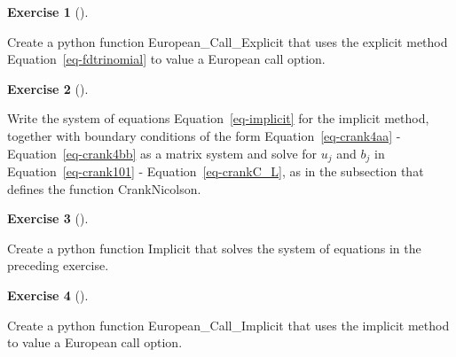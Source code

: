 \documentclass[
  letterpaper,
  DIV=11,
  numbers=noendperiod]{scrartcl}
\theoremstyle{definition}
\newtheorem{exercise}{Exercise}[section]
\theoremstyle{remark}
\begin{document}
\begin{exercise}[]\protect\hypertarget{exr-nolabel}{}\label{exr-nolabel}

Create a python function European\_Call\_Explicit that uses the explicit
method Equation~\ref{eq-fdtrinomial} to value a European call option.

\end{exercise}

\begin{exercise}[]\protect\hypertarget{exr-nolabel}{}\label{exr-nolabel}

Write the system of equations Equation~\ref{eq-implicit} for the
implicit method, together with boundary conditions of the form
Equation~\ref{eq-crank4aa} - Equation~\ref{eq-crank4bb} as a matrix
system and solve for \(u_j\) and \(b_j\) in Equation~\ref{eq-crank101} -
Equation~\ref{eq-crankC_L}, as in the subsection that defines the
function CrankNicolson.

\end{exercise}

\begin{exercise}[]\protect\hypertarget{exr-nolabel}{}\label{exr-nolabel}

Create a python function Implicit that solves the system of equations in
the preceding exercise.

\end{exercise}

\begin{exercise}[]\protect\hypertarget{exr-nolabel}{}\label{exr-nolabel}

Create a python function European\_Call\_Implicit that uses the implicit
method to value a European call option.

\end{exercise}
\end{document}

